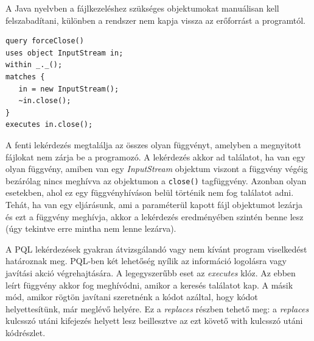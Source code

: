 \documentclass[a4paper,12pt]{report}
\begin{document}
A Java nyelvben a fájlkezeléshez szükséges objektumokat manuálisan kell felszabadítani, különben a rendszer nem kapja vissza az erőforrást a programtól.
\begin{verbatim}
query forceClose()
uses object InputStream in;
within _._();
matches {
   in = new InputStream();
   ~in.close();
}
executes in.close();
\end{verbatim} 
\par A fenti lekérdezés megtalálja az összes olyan függvényt, amelyben a megnyitott fájlokat nem zárja be a programozó. A lekérdezés akkor ad találatot, ha van egy olyan függvény, amiben van egy \textit{InputStream} objektum viszont a függvény végéig bezárólag nincs meghívva az objektumon a \texttt{close()} tagfüggvény. Azonban olyan esetekben, ahol ez egy függvényhíváson belül történik nem fog találatot adni. Tehát, ha van egy eljárásunk, ami a paraméterül kapott fájl objektumot lezárja és ezt a függvény meghívja, akkor a lekérdezés eredményében szintén benne lesz (úgy tekintve erre mintha nem lenne lezárva).
\par A PQL lekérdezések gyakran átvizsgálandó vagy nem kívánt program viselkedést határoznak meg. PQL-ben két lehetőség nyílik az információ logolásra vagy javítási akció végrehajtására. A legegyszerűbb eset az \textit{executes} klóz. Az ebben leírt függvény akkor fog meghívódni, amikor a keresés találatot kap. A másik mód, amikor rögtön javítani szeretnénk a kódot azáltal, hogy kódot helyettesítünk, már meglévő helyére. Ez a \textit{replaces} részben tehető meg: a \textit{replaces} kulcsszó utáni kifejezés helyett lesz beillesztve az ezt követő with kulcsszó utáni kódrészlet.
\end{document}
